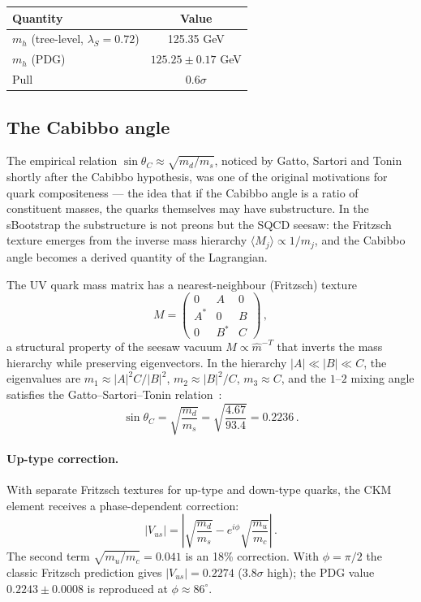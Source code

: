 \documentclass[12pt,a4paper]{article}
\begin{document}
\begin{center}
\begin{tabular}{lc}
\toprule
Quantity & Value \\
\midrule
$m_h$ (tree-level, $\lambda_S = 0.72$) & 125.35 GeV \\
$m_h$ (PDG) & $125.25 \pm 0.17$ GeV \\
Pull & $0.6\sigma$ \\
\bottomrule
\end{tabular}
\end{center}

\subsection{The Cabibbo angle}

The empirical relation $\sin\theta_C \approx \sqrt{m_d/m_s}$, noticed
by Gatto, Sartori and Tonin~\cite{GST1968} shortly after the
Cabibbo hypothesis, was one of the original motivations for quark
compositeness --- the idea that if the Cabibbo angle is a ratio of
constituent masses, the quarks themselves may have substructure.
In the sBootstrap the substructure is not preons but the SQCD
seesaw: the Fritzsch texture emerges from the inverse mass hierarchy
$\langle M_j\rangle \propto 1/m_j$, and the Cabibbo angle becomes
a derived quantity of the Lagrangian.

The UV quark mass matrix has a nearest-neighbour (Fritzsch) texture
\begin{equation}\label{eq:fritzsch}
M = \begin{pmatrix} 0 & A & 0 \\ A^* & 0 & B \\ 0 & B^* & C \end{pmatrix}\,,
\end{equation}
a structural property of the seesaw vacuum $M \propto \hat{m}^{-T}$
that inverts the mass hierarchy while preserving eigenvectors.
In the hierarchy $|A| \ll |B| \ll C$, the eigenvalues are
$m_1 \approx |A|^2 C/|B|^2$, $m_2 \approx |B|^2/C$, $m_3 \approx C$,
and the $1$--$2$ mixing angle satisfies the
Gatto--Sartori--Tonin relation~\cite{GST1968}:
\begin{equation}
\sin\theta_C = \sqrt{\frac{m_d}{m_s}}
= \sqrt{\frac{4.67}{93.4}}
= 0.2236\,.
\end{equation}

\paragraph{Up-type correction.}
With separate Fritzsch textures for up-type and down-type quarks,
the CKM element receives a phase-dependent correction:
\begin{equation}\label{eq:fritzsch-Vus}
|V_{us}| = \left|\sqrt{\frac{m_d}{m_s}}
  - e^{i\phi}\sqrt{\frac{m_u}{m_c}}\right|\,.
\end{equation}
The second term $\sqrt{m_u/m_c} = 0.041$ is an 18\% correction.
With $\phi = \pi/2$ the classic Fritzsch prediction gives
$|V_{us}| = 0.2274$ ($3.8\sigma$ high); the PDG value
$0.2243 \pm 0.0008$ is reproduced at $\phi \approx 86^\circ$.
\end{document}
